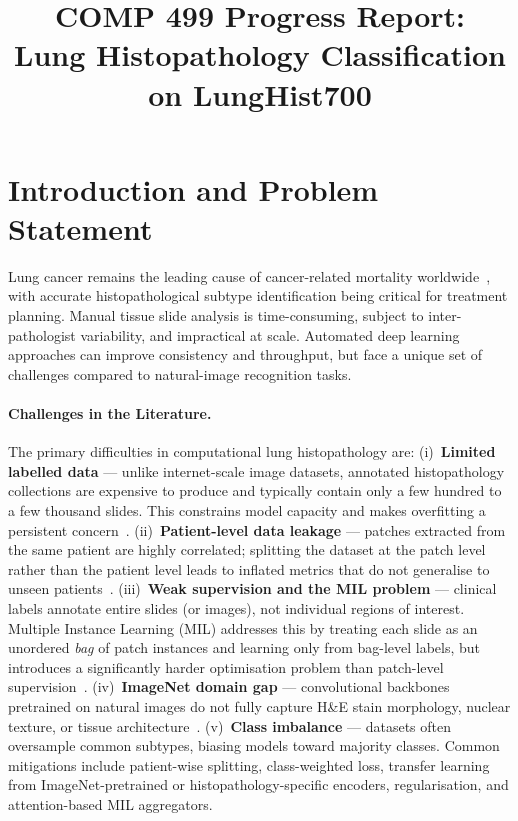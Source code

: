 \documentclass[10pt,twocolumn,letterpaper]{article}
\title{COMP 499 Progress Report:\\Lung Histopathology Classification on LungHist700}
\begin{document}
\maketitle

\section{Introduction and Problem Statement}
\label{sec:intro}

Lung cancer remains the leading cause of cancer-related mortality worldwide~\cite{sung2021}, with accurate histopathological subtype identification being critical for treatment planning. Manual tissue slide analysis is time-consuming, subject to inter-pathologist variability, and impractical at scale. Automated deep learning approaches can improve consistency and throughput, but face a unique set of challenges compared to natural-image recognition tasks.

\paragraph{Challenges in the Literature.}
The primary difficulties in computational lung histopathology are: (i)~\textbf{Limited labelled data} — unlike internet-scale image datasets, annotated histopathology collections are expensive to produce and typically contain only a few hundred to a few thousand slides. This constrains model capacity and makes overfitting a persistent concern~\cite{srinidhi2021}. (ii)~\textbf{Patient-level data leakage} — patches extracted from the same patient are highly correlated; splitting the dataset at the patch level rather than the patient level leads to inflated metrics that do not generalise to unseen patients~\cite{tellez2019}. (iii)~\textbf{Weak supervision and the MIL problem} — clinical labels annotate entire slides (or images), not individual regions of interest. Multiple Instance Learning (MIL) addresses this by treating each slide as an unordered \emph{bag} of patch instances and learning only from bag-level labels, but introduces a significantly harder optimisation problem than patch-level supervision~\cite{ilse2018,campanella2019}. (iv)~\textbf{ImageNet domain gap} — convolutional backbones pretrained on natural images do not fully capture H\&E stain morphology, nuclear texture, or tissue architecture~\cite{kather2019,chen2022}. (v)~\textbf{Class imbalance} — datasets often oversample common subtypes, biasing models toward majority classes. Common mitigations include patient-wise splitting, class-weighted loss, transfer learning from ImageNet-pretrained or histopathology-specific encoders, regularisation, and attention-based MIL aggregators.
\end{document}
